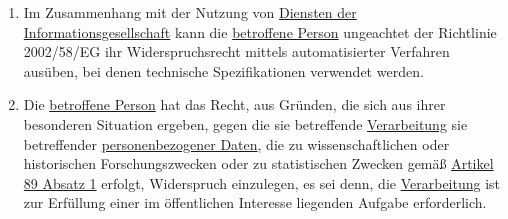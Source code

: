 \begin{enumerate}
  \item Im Zusammenhang mit der Nutzung von \hyperref[itm:04-25]{Diensten der Informationsgesellschaft} kann
   die \hyperref[itm:04-1]{betroffene Person} ungeachtet der Richtlinie 2002/58/EG ihr Widerspruchsrecht mittels automatisierter Verfahren ausüben, bei denen technische
   Spezifikationen verwendet werden.%
  \label{itm:21-5}

  \item Die \hyperref[itm:04-1]{betroffene Person} hat das Recht, aus Gründen, die sich aus ihrer besonderen Situation
   ergeben, gegen die sie betreffende \hyperref[itm:04-2]{Verarbeitung} sie betreffender \hyperref[itm:04-1]
   {personenbezogener Daten}, die zu wissenschaftlichen oder historischen Forschungszwecken oder zu statistischen
   Zwecken gemäß \hyperref[itm:89-1]{Artikel 89 Absatz 1} erfolgt, Widerspruch einzulegen, es sei denn, die \hyperref
   [itm:04-2]{Verarbeitung} ist zur Erfüllung einer im öffentlichen Interesse liegenden Aufgabe erforderlich.%
  \label{itm:21-6}

\end{enumerate}


